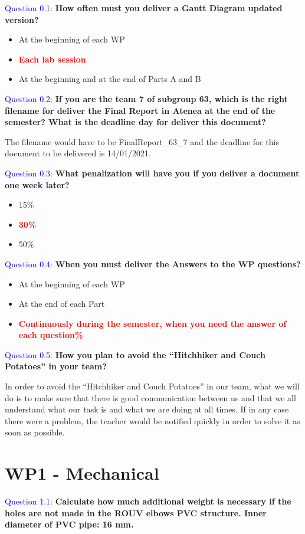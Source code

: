 \documentclass[12pt, a4papre]{article}
\begin{document}
	\textcolor{blue}{Question 0.1:} \textbf{How often must you deliver a Gantt Diagram updated version?}
	\begin{itemize}
		\item At the beginning of each WP
		\item \textcolor{red}{ \textbf{Each lab session}}
		\item At the beginning and at the end of Parts A and B
	\end{itemize}
	
	\textcolor{blue}{Question 0.2:} \textbf{If you are the team 7 of subgroup 63, which is the right filename for deliver the Final Report in Atenea at the end of the semester? What is the deadline day for deliver this document?}
	
	The filename would have to be FinalReport\_63\_7 and the deadline for this document to be delivered is 14/01/2021.
	
	\textcolor{blue}{Question 0.3:} \textbf{What penalization will have you if you deliver a document one week later?}
	\begin{itemize}
		\item 15\%
		\item \textcolor{red}{ \textbf{30\%}}
		\item 50\%
	\end{itemize}
	
	\textcolor{blue}{Question 0.4:} \textbf{When you must deliver the Answers to the WP questions?}
	\begin{itemize}
		\item At the beginning of each WP
		\item At the end of each Part
		\item \textcolor{red}{ \textbf{Continuously during the semester, when you need the answer of each question\%}}
	\end{itemize}
	
	\textcolor{blue}{Question 0.5:} \textbf{How you plan to avoid the “Hitchhiker and Couch Potatoes” in your team?}
	
	In order to avoid the “Hitchhiker and Couch Potatoes” in our team, what we will do is to make sure that there is good communication between us and that we all understand what our task is and what we are doing at all times. If in any case there were a problem, the teacher would be notified quickly in order to solve it as soon as possible.
	
	\newpage
	
	\section{WP1 - Mechanical}
	\textcolor{blue}{Question 1.1:} \textbf{Calculate how much additional weight is necessary if the holes are not made in the ROUV elbows PVC structure. Inner diameter of PVC pipe: 16 mm.}
	
\end{document}
